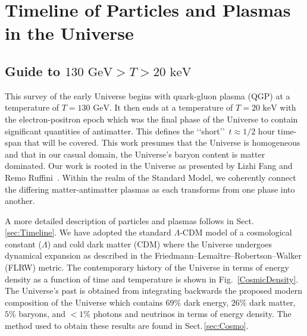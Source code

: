 \documentclass[universe,article,submit,moreauthors,pdftex,a4paper]{Definitions/mdpi}
\newcommand{\GeV}{\text{ GeV}}
\newcommand{\keV}{\text{ keV}}
\newcommand*{\rf}[1]{Fig.~{\ref{#1}}}
\newcommand*{\rsec}[1]{Sect.\,{\ref{#1}}}
\begin{document}

\tableofcontents

\section{Timeline of Particles and Plasmas in the Universe}\label{sec:Intro}
\subsection{Guide to \texorpdfstring{$130\GeV>T>20\keV$}{130\GeV>T>20\keV}}\label{sec:Guide}
\noindent This survey of the early Universe begins with quark-gluon plasma (QGP) at a temperature of $T=130\GeV$. It then ends at a temperature of $T=20\keV$ with the electron-positron epoch which was the final phase of the Universe to contain significant quantities of antimatter. This defines the \lq\lq short\rq\rq\ $t\approx1/2$ hour time-span that will be covered. This work presumes that the Universe is homogeneous and that in our casual domain, the Universe's baryon content is matter dominated. Our work is rooted in the Universe as presented by Lizhi Fang and Remo Ruffini~\cite{fang1984cosmology,fang1985galaxies,fang1987quantum}. Within the realm of the Standard Model, we coherently connect the differing matter-antimatter plasmas as each transforms from one phase into another.

A more detailed description of particles and plasmas follows in \rsec{sec:Timeline}. We have adopted the standard $\Lambda$-CDM model of a cosmological constant ($\Lambda$) and cold dark matter (CDM) where the Universe undergoes dynamical expansion as described in the Friedmann–Lemaître–Robertson–Walker (FLRW) metric. The contemporary history of the Universe in terms of energy density as a function of time and temperature is shown in \rf{CosmicDensity}. The Universe's past is obtained from integrating backwards the proposed modern composition of the Universe which contains $69\%$ dark energy, $26\%$ dark matter, $5\%$ baryons, and $<1\%$ photons and neutrinos in terms of energy density. The method used to obtain these results are found in \rsec{sec:Cosmo}.
\end{document}
